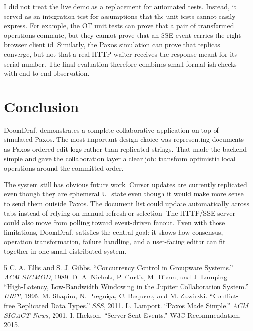 \documentclass[11pt]{article}
\begin{document}
I did not treat the live demo as a replacement for automated tests. Instead, it served as an integration test for assumptions that the unit tests cannot easily express. For example, the OT unit tests can prove that a pair of transformed operations commute, but they cannot prove that an SSE event carries the right browser client id. Similarly, the Paxos simulation can prove that replicas converge, but not that a real HTTP waiter receives the response meant for its serial number. The final evaluation therefore combines small formal-ish checks with end-to-end observation.

\section{Conclusion}

DoomDraft demonstrates a complete collaborative application on top of simulated Paxos. The most important design choice was representing documents as Paxos-ordered edit logs rather than replicated strings. That made the backend simple and gave the collaboration layer a clear job: transform optimistic local operations around the committed order.

The system still has obvious future work. Cursor updates are currently replicated even though they are ephemeral UI state even though it would make more sense to send them outside Paxos. The document list could update automatically across tabs instead of relying on manual refresh or selection. The HTTP/SSE server could also move from polling toward event-driven fanout. Even with those limitations, DoomDraft satisfies the central goal: it shows how consensus, operation transformation, failure handling, and a user-facing editor can fit together in one small distributed system.

\begin{thebibliography}{5}
 C. A. Ellis and S. J. Gibbs. ``Concurrency Control in Groupware Systems.'' \emph{ACM SIGMOD}, 1989.
 D. A. Nichols, P. Curtis, M. Dixon, and J. Lamping. ``High-Latency, Low-Bandwidth Windowing in the Jupiter Collaboration System.'' \emph{UIST}, 1995.
 M. Shapiro, N. Pregui\c{c}a, C. Baquero, and M. Zawirski. ``Conflict-free Replicated Data Types.'' \emph{SSS}, 2011.
 L. Lamport. ``Paxos Made Simple.'' \emph{ACM SIGACT News}, 2001.
 I. Hickson. ``Server-Sent Events.'' W3C Recommendation, 2015.
\end{thebibliography}
\end{document}
